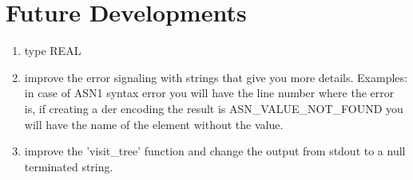 \section{Future Developments}
\begin{enumerate}
\item type REAL 
\item improve the error signaling with strings that give you more details. 
   Examples: in case of ASN1 syntax error you will have the line number where the error is,  
             if creating a der encoding the result is ASN\_VALUE\_NOT\_FOUND you will have the
             name of the element without the value.
\item improve the 'visit\_tree' function and change the output from stdout to a null terminated 
   string.  



\end{enumerate}


